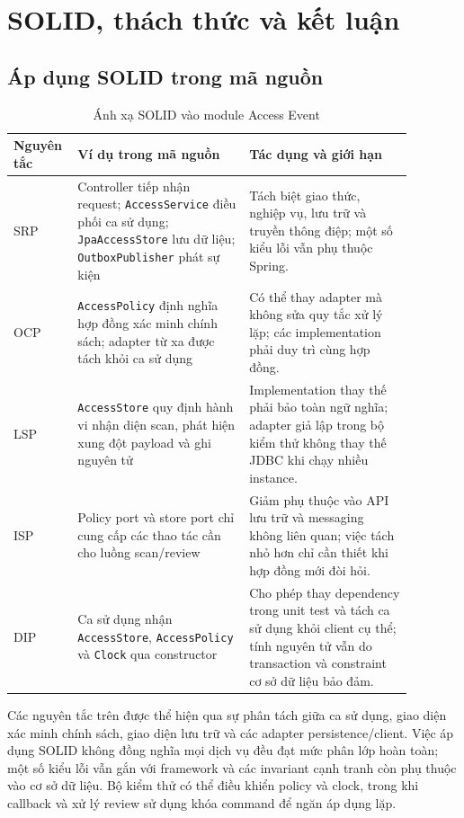﻿\section{SOLID, thách thức và kết luận}
\label{sec:reflection}

\subsection{Áp dụng SOLID trong mã nguồn}
\label{subsec:solid}
\begin{table}[htbp]
\centering
\caption{Ánh xạ SOLID vào module Access Event}\label{tab:solid}
\begin{tabular}{|>{\raggedright\arraybackslash}p{0.10\linewidth}|>{\raggedright\arraybackslash}p{0.40\linewidth}|>{\raggedright\arraybackslash}p{0.38\linewidth}|}\hline
\textbf{Nguyên tắc} & \textbf{Ví dụ trong mã nguồn} & \textbf{Tác dụng và giới hạn} \\\hline
SRP & Controller tiếp nhận request; \texttt{AccessService} điều phối ca sử dụng; \texttt{JpaAccessStore} lưu dữ liệu; \texttt{OutboxPublisher} phát sự kiện & Tách biệt giao thức, nghiệp vụ, lưu trữ và truyền thông điệp; một số kiểu lỗi vẫn phụ thuộc Spring. \\\hline
OCP & \texttt{AccessPolicy} định nghĩa hợp đồng xác minh chính sách; adapter từ xa được tách khỏi ca sử dụng & Có thể thay adapter mà không sửa quy tắc xử lý lặp; các implementation phải duy trì cùng hợp đồng. \\\hline
LSP & \texttt{AccessStore} quy định hành vi nhận diện scan, phát hiện xung đột payload và ghi nguyên tử & Implementation thay thế phải bảo toàn ngữ nghĩa; adapter giả lập trong bộ kiểm thử không thay thế JDBC khi chạy nhiều instance. \\\hline
ISP & Policy port và store port chỉ cung cấp các thao tác cần cho luồng scan/review & Giảm phụ thuộc vào API lưu trữ và messaging không liên quan; việc tách nhỏ hơn chỉ cần thiết khi hợp đồng mới đòi hỏi. \\\hline
DIP & Ca sử dụng nhận \texttt{AccessStore}, \texttt{AccessPolicy} và \texttt{Clock} qua constructor & Cho phép thay dependency trong unit test và tách ca sử dụng khỏi client cụ thể; tính nguyên tử vẫn do transaction và constraint cơ sở dữ liệu bảo đảm. \\\hline
\end{tabular}
\end{table}

Các nguyên tắc trên được thể hiện qua sự phân tách giữa ca sử dụng, giao diện xác minh chính sách, giao diện lưu trữ và các adapter persistence/client. Việc áp dụng SOLID không đồng nghĩa mọi dịch vụ đều đạt mức phân lớp hoàn toàn; một số kiểu lỗi vẫn gắn với framework và các invariant cạnh tranh còn phụ thuộc vào cơ sở dữ liệu. Bộ kiểm thử có thể điều khiển policy và clock, trong khi callback và xử lý review sử dụng khóa command để ngăn áp dụng lặp.

